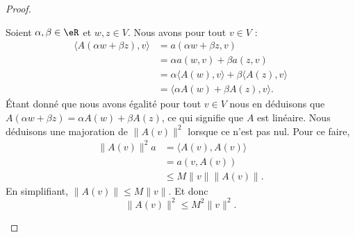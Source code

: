 \begin{proof}
\begin{subproof}
		Soient \( \alpha,\beta\in \eR\) et \( w,z\in V\). Nous avons pour tout \( v\in V\) :
		\begin{subequations}
			\begin{align}
				\langle  A(\alpha w+\beta z), v\rangle & =a(\alpha w+\beta z,v)                                     \\
				                                       & =\alpha a(w,v)+\beta a(z,v)                                \\
				                                       & =\alpha\langle A(w), v\rangle +\beta\langle A(z), v\rangle \\
				                                       & =\langle \alpha A(w)+\beta A(z), v\rangle .
			\end{align}
		\end{subequations}
		Étant donné que nous avons égalité pour tout \( v\in V\) nous en déduisons que \( A(\alpha w+\beta z)=\alpha A(w)+\beta A(z)\), ce qui signifie que \( A \) est linéaire.
		Nous déduisons une majoration de \( \| A(v) \|^2\) lorsque ce n'est pas nul. Pour ce faire,
		\begin{subequations}
			\begin{align}
				\| A(v) \|^2a & =\langle A(v), A(v)\rangle \\
				              & =a(v,A(v))                 \\
				              & \leq M\| v \|\| A(v) \|.
			\end{align}
		\end{subequations}
		En simplifiant, \( \| A(v) \|\leq M\| v \|\). Et donc
		\begin{equation}        \label{EQooBQAHooAZRdAW}
			\| A(v) \|^2\leq M^2\| v \|^2.
		\end{equation}


\end{subproof}
\end{proof}
